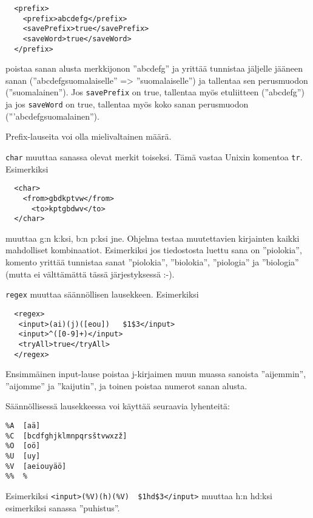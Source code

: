 \documentclass[12pt]{article}
\begin{document}
\begin{verbatim}
  <prefix>
    <prefix>abcdefg</prefix>
    <savePrefix>true</savePrefix>
    <saveWord>true</saveWord>
  </prefix>
\end{verbatim}

poistaa sanan alusta merkkijonon ''abcdefg'' ja yrittää tunnistaa
jäljelle jääneen sanan (''abcdefgsuomalaiselle'' => ''suomalaiselle'')
ja tallentaa sen perusmuodon (''suomalainen''). Jos \verb|savePrefix|
on true, tallentaa myös etuliitteen (''abcdefg'') ja jos
\verb|saveWord| on true, tallentaa myös koko sanan perusmuodon
('''abcdefgsuomalainen'').

Prefix-lauseita voi olla mielivaltainen määrä.



\bigskip
\verb|char| muuttaa sanassa olevat merkit toiseksi. Tämä vastaa Unixin
komentoa \verb|tr|. Esimerkiksi

\begin{verbatim}
  <char>
    <from>gbdkptvw</from>
      <to>kptgbdwv</to>
  </char>
\end{verbatim}

muuttaa g:n k:ksi, b:n p:ksi jne. Ohjelma testaa muutettavien
kirjainten kaikki mahdolliset kombinaatiot. Esimerkiksi jos
tiedostosta luettu sana on ''piolokia'', komento yrittää tunnistaa
sanat ''piolokia'', ''biolokia'', ''piologia'' ja ''biologia'' (mutta
ei välttämättä tässä järjestyksessä :-).




\verb|regex| muuttaa säännöllisen lausekkeen. Esimerkiksi

\begin{verbatim}
  <regex>
   <input>(ai)(j)([eou])   $1$3</input>
   <input>^([0-9]+)</input>
   <tryAll>true</tryAll>
  </regex>
\end{verbatim}

Ensimmäinen input-lause poistaa j-kirjaimen muun muassa sanoista
''aijemmin'', ''aijomme'' ja ''kaijutin'', ja toinen poistaa numerot
sanan alusta.


Säännöllisessä lausekkeessa voi käyttää seuraavia lyhenteitä:

\begin{verbatim}
%A  [aä]
%C  [bcdfghjklmnpqrsštvwxzž]
%O  [oö]
%U  [uy]
%V  [aeiouyäö]
%%  %
\end{verbatim}

Esimerkiksi \verb=<input>(%V)(h)(%V)  $1hd$3</input>=
muuttaa h:n hd:ksi esimerkiksi sanassa ''puhistus''.
\end{document}
